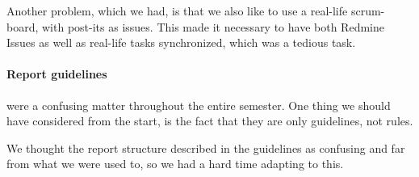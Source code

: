 Another problem, which we had, is that we also like to use a real-life scrum-board, with post-its as issues.
This made it necessary to have both Redmine Issues as well as real-life tasks synchronized, which was a tedious task.

\paragraph{Report guidelines} were a confusing matter throughout the entire semester.
One thing we should have considered from the start, is the fact that they are only guidelines, not rules.

We thought the report structure described in the guidelines as confusing and far from what we were used to, so we had a hard time adapting to this.

